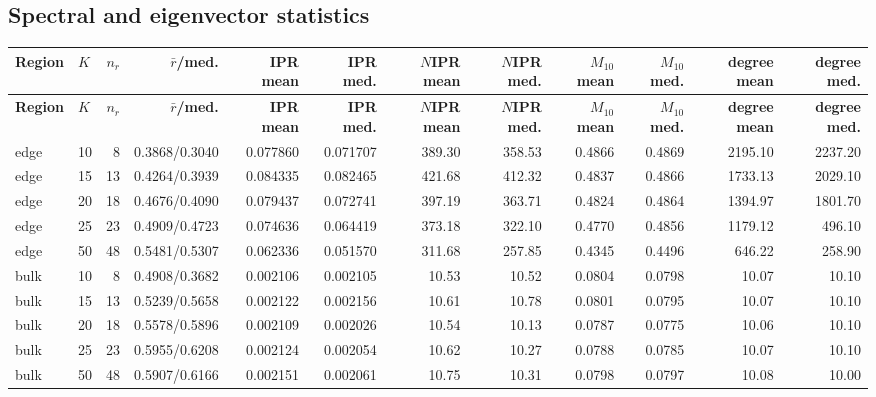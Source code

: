 \documentclass[10pt,letterpaper]{article}
\newcommand{\Hdr}[1]{\cellcolor{navy}\color{white}\bfseries #1}
\begin{document}
\subsection{Spectral and eigenvector statistics}\scriptsize\setlength{\tabcolsep}{1.2pt}
\begin{longtable}{|l|l|r|r|r|r|r|r|r|r|r|r|}\hline
\Hdr{Region} & \Hdr{$K$} & \Hdr{$n_r$} & \Hdr{$\bar r$/med.} & \Hdr{IPR mean} & \Hdr{IPR med.} & \Hdr{$N$IPR mean} & \Hdr{$N$IPR med.} & \Hdr{$M_{10}$ mean} & \Hdr{$M_{10}$ med.} & \Hdr{degree mean} & \Hdr{degree med.}\\\hline\endfirsthead
\hline \Hdr{Region} & \Hdr{$K$} & \Hdr{$n_r$} & \Hdr{$\bar r$/med.} & \Hdr{IPR mean} & \Hdr{IPR med.} & \Hdr{$N$IPR mean} & \Hdr{$N$IPR med.} & \Hdr{$M_{10}$ mean} & \Hdr{$M_{10}$ med.} & \Hdr{degree mean} & \Hdr{degree med.}\\\hline\endhead
edge & 10 & 8 & 0.3868/0.3040 & 0.077860 & 0.071707 & 389.30 & 358.53 & 0.4866 & 0.4869 & 2195.10 & 2237.20 \\\hline
edge & 15 & 13 & 0.4264/0.3939 & 0.084335 & 0.082465 & 421.68 & 412.32 & 0.4837 & 0.4866 & 1733.13 & 2029.10 \\\hline
edge & 20 & 18 & 0.4676/0.4090 & 0.079437 & 0.072741 & 397.19 & 363.71 & 0.4824 & 0.4864 & 1394.97 & 1801.70 \\\hline
edge & 25 & 23 & 0.4909/0.4723 & 0.074636 & 0.064419 & 373.18 & 322.10 & 0.4770 & 0.4856 & 1179.12 & 496.10 \\\hline
edge & 50 & 48 & 0.5481/0.5307 & 0.062336 & 0.051570 & 311.68 & 257.85 & 0.4345 & 0.4496 & 646.22 & 258.90 \\\hline
\hline
bulk & 10 & 8 & 0.4908/0.3682 & 0.002106 & 0.002105 & 10.53 & 10.52 & 0.0804 & 0.0798 & 10.07 & 10.10 \\\hline
bulk & 15 & 13 & 0.5239/0.5658 & 0.002122 & 0.002156 & 10.61 & 10.78 & 0.0801 & 0.0795 & 10.07 & 10.10 \\\hline
bulk & 20 & 18 & 0.5578/0.5896 & 0.002109 & 0.002026 & 10.54 & 10.13 & 0.0787 & 0.0775 & 10.06 & 10.10 \\\hline
bulk & 25 & 23 & 0.5955/0.6208 & 0.002124 & 0.002054 & 10.62 & 10.27 & 0.0788 & 0.0785 & 10.07 & 10.10 \\\hline
bulk & 50 & 48 & 0.5907/0.6166 & 0.002151 & 0.002061 & 10.75 & 10.31 & 0.0798 & 0.0797 & 10.08 & 10.00 \\\hline
\hline
\hline\end{longtable}
\end{document}
